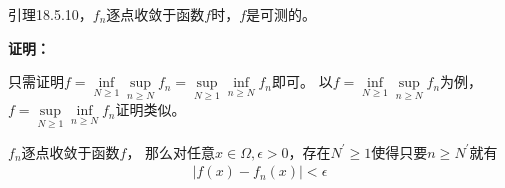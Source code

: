 \documentclass{article}
\begin{document}







\begin{zremark}
  引理18.5.10，$f_n$逐点收敛于函数$f$时，$f$是可测的。
\end{zremark}

\textbf{证明：}

只需证明$f = \inf\limits_{N \geq 1} \sup\limits_{n \geq N} f_n = \sup\limits_{N \geq 1} \inf\limits_{n \geq N} f_n$即可。
以$f = \inf\limits_{N \geq 1} \sup\limits_{n \geq N} f_n$为例，$f = \sup\limits_{N \geq 1} \inf\limits_{n \geq N} f_n$证明类似。

$f_n$逐点收敛于函数$f$，
那么对任意$x \in \Omega, \epsilon > 0$，存在$N^\prime \geq 1$使得只要$n \geq N^\prime$就有
\begin{align*}
  |f(x) - f_n(x)| < \epsilon
\end{align*}
\end{document}
